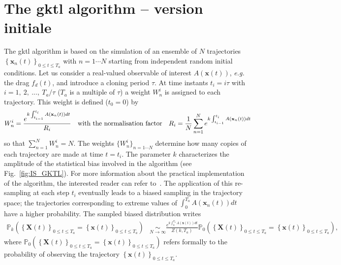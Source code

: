 \documentclass{jfm}
\begin{document}
\section{The \acl{gktl} algorithm -- version initiale}
\label{app:gktl_description}
The \ac{gktl} algorithm is based on the simulation of an ensemble of $N$ trajectories $\left\{\mathbf{x}_{n}(t)\right\}_{0\leq t \leq T_a}$ with $ n =1 \cdots N$ starting from independent random initial conditions.
%
Let us consider a real-valued observable of interest $A(\mathbf{x}(t))$, {\emph{e.g.} the drag $f_d(t)$}, and introduce a cloning period $\tau$.
%
At time instants $t_{i}=i\tau$ with $i=1,~2,~...,~T_{a}/\tau$ ($T_{a}$ is a multiple of $\tau$) a weight $W_{n}^{i}$ is assigned to each trajectory. This weight is defined ($t_0=0$) by
%
\begin{equation}
W_{n}^{i}=\frac{e^{k\intop_{t_{i-1}}^{t_{i}}A(\mathbf{x}_{n}(t))dt}}{R_{i}}\quad \mbox{with the normalisation factor} \quad R_{i}=\frac{1}{N}\sum_{n=1}^{N}e^{k\int_{t_{i-1}}^{t_{i}}A(\mathbf{x}_{n}(t))dt}
\label{eq:Weight}
\end{equation}
so that $\sum_{n=1}^N W_n^i = N$.
%
%
{The weights $\{W_{n}^{i}\}_{n=1\cdots N}$ determine how many copies of each trajectory are made at time $t=t_i$. The parameter $k$ characterizes the amplitude of the statistical bias involved in the algorithm (see Fig.~\ref{fig:IS_GKTL}). For more information about the practical implementation of the algorithm, the interested reader can refer to~\cite{brewer2018efficient, lestang:tel-01974316}}.
The application of this re-sampling at each step $t_i$ eventually leads to a biased sampling in the trajectory space; the trajectories corresponding to extreme values of $\int_{0}^{T_a}A(\mathbf{x}_{n}(t))dt$ have a higher probability.
%
The sampled biased distribution writes
%
\begin{align}
\mathbb{P}_{k}\left(\left\{ \mathbf{X}(t)\right\} _{0\leq t\leq T_{a}}=\left\{ \mathbf{x}(t)\right\} _{0\leq t\leq T_{a}}\right) &\underset{N\rightarrow\infty}{\sim} \frac{e^{k\int_{0}^{T_{a}}A(\mathbf{x}(t))dt}}{Z(k,T_a)}\mathbb{\mathbb{P}}_{0}\left(\left\{ \mathbf{X}(t)\right\} _{0\leq t\leq T_{a}}=\left\{ \mathbf{x}(t)\right\} _{0\leq t\leq T_{a}}\right),
\label{eq:Biased_Path_Approximation}
\end{align}
where
$\mathbb{P}_{0}\left(\left\{ \mathbf{X}(t)\right\} _{0\leq t\leq T_{a}} = \left\{ \mathbf{x}(t)\right\} _{0\leq t\leq T_{a}}\right)$ 
refers formally to the probability of observing the trajectory 
$\left\{ \mathbf{x}(t)\right\} _{0\leq t\leq T_{a}}$.
\end{document}
